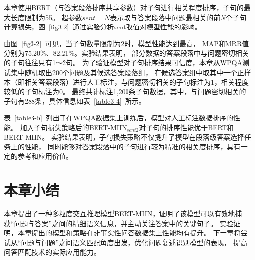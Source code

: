 本章使用BERT（与答案段落排序共享参数）对子句进行相关程度排序，子句的最大长度限制为55。
超参数$sent=N$表示取与答案段落中问题最相关的前$N$个子句计算损失，图~\ref{fig3-2}~通过实验分析sent取值对模型性能的影响。



由图~\ref{fig3-2}~可见，当子句数量限制为2时，模型性能达到最高，
MAP和MRR值分别为75.20\%、82.21\%。实验结果表明，
部分数据的答案段落中与问题密切相关的子句往往只有1～2句。
为了验证模型对子句排序结果可信度，本章从WPQA测试集中随机取出200个问题及其候选答案段落组，
在候选答案组中取其中一个正样本（即相关答案段落）进行人工标注，与问题密切相关的子句标注为1，相关程度较低的子句标注为0。
最终共计标注1,200条子句数据，其中，与问题密切相关的子句有288条，具体信息如表~\ref{table3-4}~所示。



表~\ref{table3-5}~列出了在WPQA数据集上训练后，模型对人工标注数据排序的性能。
加入子句损失策略后的BERT-MIIN$_{sent2}$对子句的排序性能优于BERT和BERT-MIIN。
实验结果表明，子句损失策略不仅提升了模型在段落级答案选择任务上的性能，
同时能够对答案段落中的子句进行较为精准的相关度排序，具有一定的参考和应用价值。



\section{本章小结}

本章提出了一种多粒度交互推理模型BERT-MIIN，证明了该模型可以有效地捕获“问题与答案”之间的精细语义信息，并主动关注答案中的关键句子。
实验证明，本章提出的模型和策略在非事实性问答数据集上性能均有提升。
下一章将尝试从“问题与问题”之间语义匹配角度出发，优化问题复述识别模型的表现，
提高问答匹配技术的实际应用能力。




